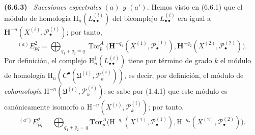 \documentclass[10pt,oneside]{book}
\newenvironment{env}[1][]{\par\medskip\noindent\textbf{(#1)}\ }{\par}
\begin{document}
\begin{env}[6.6.3]
\label{III.6.6.3}
\emph{Sucesiones espectrales $(a)$ y $(a')$.} Hemos visto en (6.6.1) que el
módulo de homología $\mathrm H_n(L_{\bullet\bullet}^{(i)})$ del bicomplejo
$L_{\bullet\bullet}^{(i)}$ era igual a
$\mathbf H^{-n}(X^{(i)},\mathscr P_\bullet^{(i)})$; por tanto,
\[
  {}^{(a)}E_{pq}^2
  =\bigoplus_{q_1+q_2=q}
   \operatorname{Tor}_p^A
   \bigl(\mathbf H^{-q_1}(X^{(1)},\mathscr P_\bullet^{(1)}),
         \mathbf H^{-q_2}(X^{(2)},\mathscr P_\bullet^{(2)})\bigr).
\]
Por definición, el complejo
$\mathrm H_n^{\mathrm I}(L_{\bullet\bullet}^{(i)})$ tiene por término de grado
$k$ el módulo de homología
$\mathrm H_n(C^\bullet(\mathfrak U^{(i)},\mathscr P_k^{(i)}))$, es decir,
por definición, el módulo de \emph{cohomología}
$\mathrm H^{-n}(\mathfrak U^{(i)},\mathscr P_k^{(i)})$; se sabe por (1.4.1)
que este módulo es canónicamente isomorfo a
$\mathrm H^{-n}(X^{(i)},\mathscr P_k^{(i)})$; por tanto,
\[
  {}^{(a')}E_{pq}^2
  =\bigoplus_{q_1+q_2=q}
   \mathbf{Tor}_p^A
   \bigl(\mathrm H^{-q_1}(X^{(1)},\mathscr P_\bullet^{(1)}),
         \mathrm H^{-q_2}(X^{(2)},\mathscr P_\bullet^{(2)})\bigr).
\]
\end{env}
\end{document}
